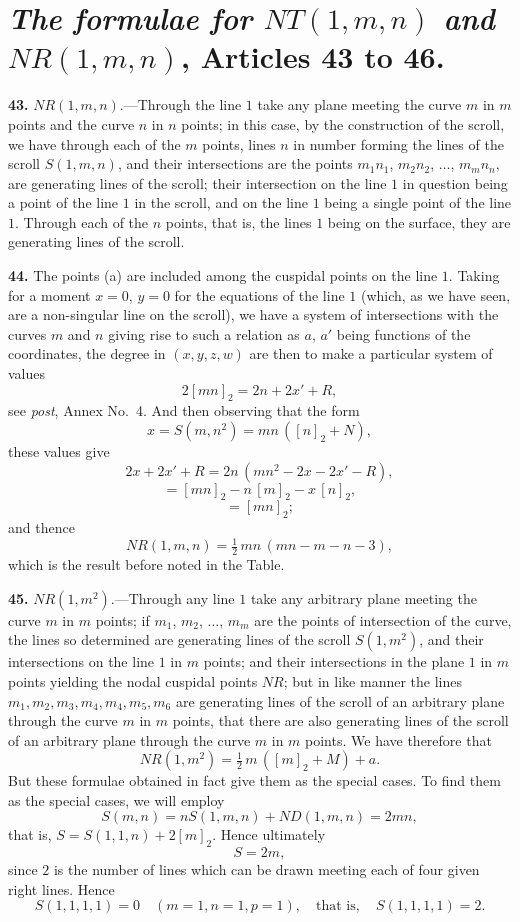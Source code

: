 \documentclass[11pt,a4paper]{article}
\begin{document}
\section*{\textit{The formulae for $NT(1, m, n)$ and $NR(1, m, n)$}, Articles 43 to 46.}

\textbf{43.} $NR(1, m, n)$.---Through the line $1$ take any plane meeting the curve $m$ in $m$ points and the curve $n$ in $n$ points; in this case, by the construction of the scroll, we have through each of the $m$ points, lines $n$ in number forming the lines of the scroll $S(1, m, n)$, and their intersections are the points $m_1n_1$, $m_2n_2$, $\ldots$, $m_mn_n$, are generating lines of the scroll; their intersection on the line $1$ in question being a point of the line $1$ in the scroll, and on the line $1$ being a single point of the line $1$. Through each of the $n$ points, that is, the lines $1$ being on the surface, they are generating lines of the scroll.

\medskip

\textbf{44.} The points (a) are included among the cuspidal points on the line $1$. Taking for a moment $x=0$, $y=0$ for the equations of the line $1$ (which, as we have seen, are a non-singular line on the scroll), we have a system of intersections with the curves $m$ and $n$ giving rise to such a relation as $a$, $a'$ being functions of the coordinates, the degree in $(x, y, z, w)$ are then to make a particular system of values
\[
2[mn]_2 = 2n + 2x' + R,
\]
see \textit{post}, Annex No.\ 4. And then observing that the form
\[
x = S(m, n^2) = mn\,([n]_2 + N),
\]
these values give
\[
2x + 2x' + R = 2n\,(mn^2 - 2x - 2x' - R),
\]
\[
= [mn]_2 - n\,[m]_2 - x\,[n]_2,
\]
\[
= [mn]_2;
\]
and thence
\[
NR(1, m, n) = \tfrac{1}{2}\,mn\,(mn - m - n - 3),
\]
which is the result before noted in the Table.

\medskip

\textbf{45.} $NR(1, m^2)$.---Through any line $1$ take any arbitrary plane meeting the curve $m$ in $m$ points; if $m_1$, $m_2$, $\ldots$, $m_m$ are the points of intersection of the curve, the lines so determined are generating lines of the scroll $S(1, m^2)$, and their intersections on the line $1$ in $m$ points; and their intersections in the plane $1$ in $m$ points yielding the nodal cuspidal points $NR$; but in like manner the lines $m_1, m_2, m_3, m_4, m_4, m_5, m_6$ are generating lines of the scroll of an arbitrary plane through the curve $m$ in $m$ points, that there are also generating lines of the scroll of an arbitrary plane through the curve $m$ in $m$ points. We have therefore that
\[
NR(1, m^2) = \tfrac{1}{2}\,m\,([m]_2 + M) + a.
\]
But these formulae obtained in fact give them as the special cases. To find them as the special cases, we will employ
\[
S(m, n) = nS(1, m, n) + ND(1, m, n) = 2 m n,
\]
that is, $S = S(1, 1, n) + 2[m]_2$. Hence ultimately
\[
S = 2 m,
\]
since $2$ is the number of lines which can be drawn meeting each of four given right lines. Hence
\[
S(1, 1, 1, 1) = 0\quad (m=1, n=1, p=1),\quad \text{that is}, \quad S(1, 1, 1, 1) = 2.
\]
\end{document}
